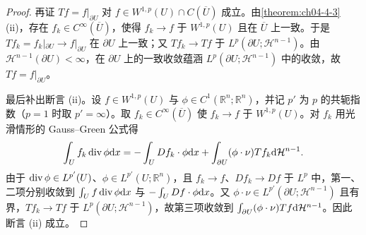 \documentclass[../../main.tex]{subfiles}%
\begin{document}
\begin{proof}
再证 $Tf=f|_{\partial U}$ 对 $f\in W^{1,p}(U)\cap C(\overline{U})$ 成立。由\cref{theorem:ch04-4-3}(ii)，存在 $f_k\in C^\infty(\overline{U})$，使得 $f_k\to f$ 于 $W^{1,p}(U)$ 且在 $\overline{U}$ 上一致。于是 $Tf_k=f_k|_{\partial U}\to f|_{\partial U}$ 在 $\partial U$ 上一致；又 $Tf_k\to Tf$ 于 $L^p(\partial U;\mathcal{H}^{n-1})$。由 $\mathcal{H}^{n-1}(\partial U)<\infty$，在 $\partial U$ 上的一致收敛蕴涵 $L^p(\partial U;\mathcal{H}^{n-1})$ 中的收敛，故 $Tf=f|_{\partial U}$。%

最后补出断言 (ii)。设 $f\in W^{1,p}(U)$ 与 $\phi\in C^1(\mathbb{R}^n;\mathbb{R}^n)$，并记 $p'$ 为 $p$ 的共轭指数（$p=1$ 时取 $p'=\infty$）。取 $f_k\in C^\infty(\overline{U})$ 使 $f_k\to f$ 于 $W^{1,p}(U)$。对 $f_k$ 用光滑情形的 Gauss--Green 公式得
\begin{align*}
\int_U f_k\operatorname{div}\phi\mathrm{d} x=-\int_U Df_k\cdot\phi\mathrm{d} x+\int_{\partial U}(\phi\cdot\nu)Tf_k\mathrm{d}\mathcal{H}^{n-1}.
\end{align*}
由于 $\operatorname{div}\phi\in L^{p'}(U)$、$\phi\in L^{p'}(U;\mathbb{R}^n)$，且 $f_k\to f$、$Df_k\to Df$ 于 $L^p$ 中，第一、二项分别收敛到 $\int_Uf\operatorname{div}\phi\mathrm{d} x$ 与 $-\int_UDf\cdot\phi\mathrm{d} x$。又 $\phi\cdot\nu\in L^{p'}(\partial U;\mathcal{H}^{n-1})$ 且有界，$Tf_k\to Tf$ 于 $L^p(\partial U;\mathcal{H}^{n-1})$，故第三项收敛到 $\int_{\partial U}(\phi\cdot\nu)Tf\mathrm{d}\mathcal{H}^{n-1}$。因此断言 (ii) 成立。
\end{proof}
\end{document}
